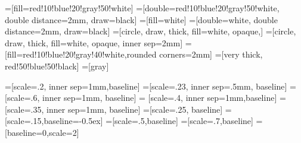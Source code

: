 =[fill=red!10!blue!20!gray!50!white]
=[double=red!10!blue!20!gray!50!white, double distance=2mm, draw=black]
=[fill=white]
=[double=white, double distance=2mm, draw=black]
=[circle, draw, thick, fill=white, opaque,]
=[circle, draw, thick, fill=white, opaque, inner sep=2mm]
= [fill=red!10!blue!20!gray!40!white,rounded corners=2mm] 
=[very thick, red!50!blue!50!black]
=[gray]

=[scale=.2, inner sep=1mm,baseline]
=[scale=.23, inner sep=.5mm, baseline]
=[scale=.6, inner sep=1mm, baseline]
= [scale=.4, inner sep=1mm,baseline] 
=[scale=.35, inner sep=1mm, baseline]
=[scale=.25, baseline]
=[scale=.15,baseline=-0.5ex]
=[scale=.5,baseline]
=[scale=.7,baseline]
=[baseline=0,scale=2]